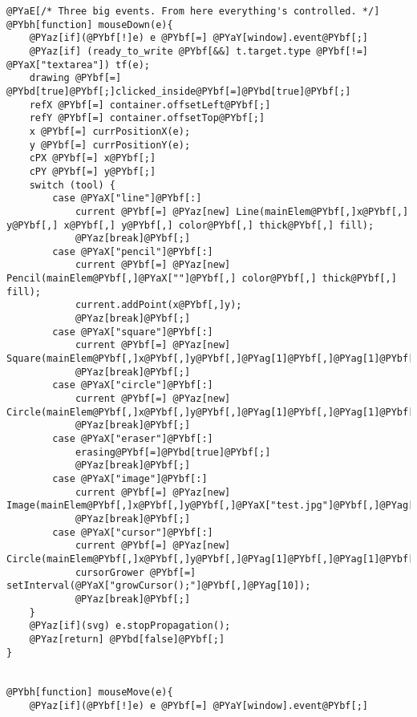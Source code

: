 \begin{Verbatim}[commandchars=@\[\]]
@PYaE[/* Three big events. From here everything's controlled. */]
@PYbh[function] mouseDown(e){
	@PYaz[if](@PYbf[!]e) e @PYbf[=] @PYaY[window].event@PYbf[;]
	@PYaz[if] (ready_to_write @PYbf[&&] t.target.type @PYbf[!=] @PYaX["textarea"]) tf(e);
    drawing @PYbf[=] @PYbd[true]@PYbf[;]clicked_inside@PYbf[=]@PYbd[true]@PYbf[;]
    refX @PYbf[=] container.offsetLeft@PYbf[;]
    refY @PYbf[=] container.offsetTop@PYbf[;]
    x @PYbf[=] currPositionX(e);
    y @PYbf[=] currPositionY(e);
    cPX @PYbf[=] x@PYbf[;]
    cPY @PYbf[=] y@PYbf[;]
    switch (tool) {
        case @PYaX["line"]@PYbf[:]
            current @PYbf[=] @PYaz[new] Line(mainElem@PYbf[,]x@PYbf[,] y@PYbf[,] x@PYbf[,] y@PYbf[,] color@PYbf[,] thick@PYbf[,] fill);
            @PYaz[break]@PYbf[;]
        case @PYaX["pencil"]@PYbf[:]
			current @PYbf[=] @PYaz[new] Pencil(mainElem@PYbf[,]@PYaX[""]@PYbf[,] color@PYbf[,] thick@PYbf[,] fill);
			current.addPoint(x@PYbf[,]y);
            @PYaz[break]@PYbf[;]
        case @PYaX["square"]@PYbf[:]
			current @PYbf[=] @PYaz[new] Square(mainElem@PYbf[,]x@PYbf[,]y@PYbf[,]@PYag[1]@PYbf[,]@PYag[1]@PYbf[,]color@PYbf[,]thick@PYbf[,]fill);
            @PYaz[break]@PYbf[;]
        case @PYaX["circle"]@PYbf[:]
			current @PYbf[=] @PYaz[new] Circle(mainElem@PYbf[,]x@PYbf[,]y@PYbf[,]@PYag[1]@PYbf[,]@PYag[1]@PYbf[,]color@PYbf[,]thick@PYbf[,]fill);
            @PYaz[break]@PYbf[;]
        case @PYaX["eraser"]@PYbf[:]
            erasing@PYbf[=]@PYbd[true]@PYbf[;]
            @PYaz[break]@PYbf[;]
        case @PYaX["image"]@PYbf[:]
            current @PYbf[=] @PYaz[new] Image(mainElem@PYbf[,]x@PYbf[,]y@PYbf[,]@PYaX["test.jpg"]@PYbf[,]@PYag[1]);
            @PYaz[break]@PYbf[;]
		case @PYaX["cursor"]@PYbf[:]
			current @PYbf[=] @PYaz[new] Circle(mainElem@PYbf[,]x@PYbf[,]y@PYbf[,]@PYag[1]@PYbf[,]@PYag[1]@PYbf[,]@PYaX["red"]@PYbf[,]@PYag[2]@PYbf[,]@PYag[90]);
			cursorGrower @PYbf[=] setInterval(@PYaX["growCursor();"]@PYbf[,]@PYag[10]);
			@PYaz[break]@PYbf[;]
    }
	@PYaz[if](svg) e.stopPropagation();
	@PYaz[return] @PYbd[false]@PYbf[;]
}


@PYbh[function] mouseMove(e){
	@PYaz[if](@PYbf[!]e) e @PYbf[=] @PYaY[window].event@PYbf[;]


\end{Verbatim}
